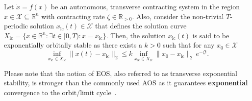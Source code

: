 \begin{definition}\label{def:osmp:exponential_orbital_stability}
    Let $\dot{x} = f(x)$ be an autonomous, transverse contracting system in the region $x \in \mathcal{X} \subseteq \mathbb{R}^n$ with contracting rate $\zeta \in \mathbb{R}_{>0}$. 
    Also, consider the non-trivial $T$-periodic solution $x_\mathrm{lc}(t) \in \mathcal{X}$ that defines the solution curve $X_\mathrm{lc} = \{ x \in \mathbb{R}^n : \exists t \in [0,T):x=x_\mathrm{lc} \}$.
    Then, the solution $x_\mathrm{lc}(t)$ is said to be exponentially orbitally stable as there exists a $k > 0$ such that for any $x_0 \in \mathcal{X}$
    \begin{equation}
        \inf_{x_\mathrm{lc} \in X_\mathrm{lc}} \lVert x(t) - x_\mathrm{lc} \rVert_2 \leq k \inf_{x_\mathrm{lc} \in X_\mathrm{lc}} \lVert x_0 - x_\mathrm{lc} \rVert_2 \, e^{-\zeta t}.
    \end{equation}
\end{definition}
Please note that the notion of \gls{EOS}, also referred to as transverse exponential stability, is stronger than the commonly used \gls{AOS} as it guarantees \textbf{exponential} convergence to the orbit/limit cycle~\citep{manchester2011transverse}.

